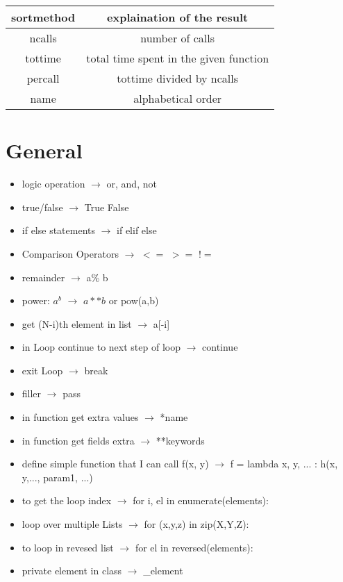 \documentclass{article}
\begin{document}
\begin{multicols}{2}
\begin{center}
\begin{tabular}{ |c |c |}
\hline
sortmethod & explaination  of the result\\ \hline \hline
 ncalls & number of calls \\ \hline
 tottime &  total time spent in the given function \\  \hline
 percall &  tottime divided by ncalls \\ \hline
 name & alphabetical order \\ \hline   
\end{tabular}
\end{center}



\section{General}
\begin{itemize}
\item logic operation $\rightarrow$ or, and, not
\item true/false $\rightarrow$ True False
\item if else statements $\rightarrow$ if elif else
\item Comparison Operators $\rightarrow$ $<=$ \quad  $>=$ \quad    $!=$  
\item remainder  $\rightarrow$ a\% b
\item power: $a^{b}$ $\rightarrow$ $a**b$ or pow(a,b)
\item get (N-i)th element in list $\rightarrow$ a[-i]
\item in Loop continue to next step of loop $\rightarrow$ continue
\item exit Loop $\rightarrow$ break
\item filler $\rightarrow$ pass
\item in function get extra values $\rightarrow$ *name
\item in function get fields extra $\rightarrow$ **keywords
\item define simple function that I can call f(x, y) $\rightarrow$ f = lambda x, y, ... : h(x, y,..., param1, ...)
\item to get the loop index $\rightarrow$ for i, el in enumerate(elements):
\item loop over multiple Lists $\rightarrow$ for (x,y,z) in zip(X,Y,Z):
\item to loop in revesed list $\rightarrow$ for  el in reversed(elements):
\item private element in class $\rightarrow$ \_element

\end{itemize}
\end{multicols}
\end{document}
